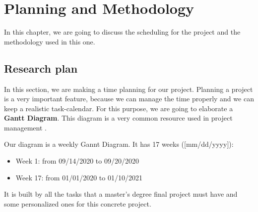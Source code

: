 \chapter{Planning and Methodology}
\label{chapter:planning}

In this chapter, we are going to discuss the scheduling for the project and the methodology used in this one.

\section{Research plan}
In this section, we are making a time planning for our project. Planning a project is a very important feature, because we can manage the time properly and we can keep a realistic task-calendar. For this purpose, we are going to elaborate a \textbf{Gantt Diagram}. This diagram is a very common resource used in project management \cite{tfm_cunha}.

Our diagram is a weekly Gannt Diagram. It has 17 weeks ([mm/dd/yyyy]): 

\begin{itemize}
    \item Week 1: from 09/14/2020 to 09/20/2020
    \item Week 17: from 01/01/2020 to 01/10/2021
\end{itemize}

It is built by all the tasks that a master's degree final project must have and some personalized ones for this concrete project.


\clearpage

%



